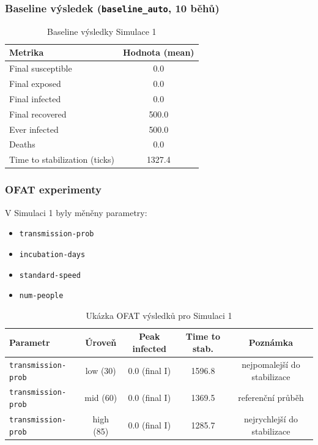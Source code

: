 \subsubsection{Baseline výsledek (\texttt{baseline\_auto}, 10 běhů)}

\begin{table}[h]
\centering
\begin{tabular}{l c}
\hline
\textbf{Metrika} & \textbf{Hodnota (mean)} \\
\hline
Final susceptible & 0.0 \\
Final exposed & 0.0 \\
Final infected & 0.0 \\
Final recovered & 500.0 \\
Ever infected & 500.0 \\
Deaths & 0.0 \\
Time to stabilization (ticks) & 1327.4 \\
\hline
\end{tabular}
\caption{Baseline výsledky Simulace 1}
\label{tab:s1_baseline}
\end{table}

\subsubsection{OFAT experimenty}

V Simulaci 1 byly měněny parametry:
\begin{itemize}
\item \texttt{transmission-prob}
\item \texttt{incubation-days}
\item \texttt{standard-speed}
\item \texttt{num-people}
\end{itemize}

\begin{table}[h]
\centering
\begin{tabular}{l c c c c}
\hline
\textbf{Parametr} & \textbf{Úroveň} & \textbf{Peak infected} & \textbf{Time to stab.} & \textbf{Poznámka} \\
\hline
\texttt{transmission-prob} & low (30) & 0.0 (final I) & 1596.8 & nejpomalejší do stabilizace \\
\texttt{transmission-prob} & mid (60) & 0.0 (final I) & 1369.5 & referenční průběh \\
\texttt{transmission-prob} & high (85) & 0.0 (final I) & 1285.7 & nejrychlejší do stabilizace \\
\hline
\end{tabular}
\caption{Ukázka OFAT výsledků pro Simulaci 1}
\label{tab:s1_ofat}
\end{table}


